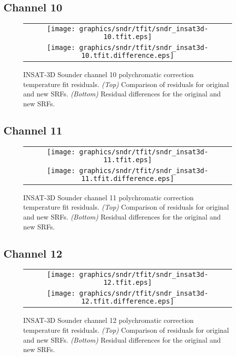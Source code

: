 \subsection{Channel 10}
\begin{figure}[H]
  \label{fig:sndr_ch10_tfit}
  \centering
  \begin{tabular}{c}
    \texttt{[image: graphics/sndr/tfit/sndr\_insat3d-10.tfit.eps]} \\
    \texttt{[image: graphics/sndr/tfit/sndr\_insat3d-10.tfit.difference.eps]}
  \end{tabular}
  \caption{INSAT-3D Sounder channel 10 polychromatic correction temperature fit residuals. \emph{(Top)} Comparison of residuals for original and new SRFs. \emph{(Bottom)} Residual differences for the original and new SRFs.}
\end{figure}

\subsection{Channel 11}
\begin{figure}[H]
  \label{fig:sndr_ch11_tfit}
  \centering
  \begin{tabular}{c}
    \texttt{[image: graphics/sndr/tfit/sndr\_insat3d-11.tfit.eps]} \\
    \texttt{[image: graphics/sndr/tfit/sndr\_insat3d-11.tfit.difference.eps]}
  \end{tabular}
  \caption{INSAT-3D Sounder channel 11 polychromatic correction temperature fit residuals. \emph{(Top)} Comparison of residuals for original and new SRFs. \emph{(Bottom)} Residual differences for the original and new SRFs.}
\end{figure}

\subsection{Channel 12}
\begin{figure}[H]
  \label{fig:sndr_ch12_tfit}
  \centering
  \begin{tabular}{c}
    \texttt{[image: graphics/sndr/tfit/sndr\_insat3d-12.tfit.eps]} \\
    \texttt{[image: graphics/sndr/tfit/sndr\_insat3d-12.tfit.difference.eps]}
  \end{tabular}
  \caption{INSAT-3D Sounder channel 12 polychromatic correction temperature fit residuals. \emph{(Top)} Comparison of residuals for original and new SRFs. \emph{(Bottom)} Residual differences for the original and new SRFs.}
\end{figure}


